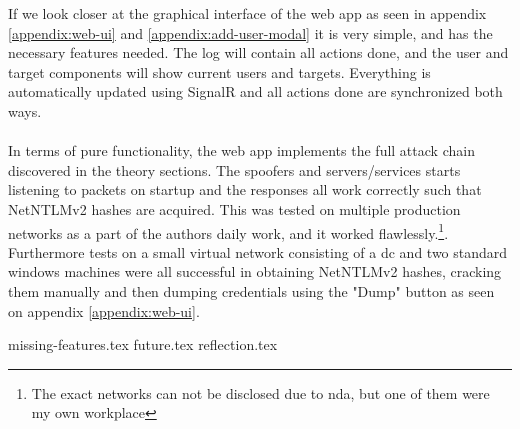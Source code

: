\documentclass{article}
\begin{document}
If we look closer at the graphical interface of the web app as seen in appendix \ref{appendix:web-ui} and \ref{appendix:add-user-modal} it is very simple, and has the necessary features needed. The log will contain all actions done, and the user and target components will show current users and targets. Everything is automatically updated using SignalR and all actions done are synchronized both ways.
\\\\
In terms of pure functionality, the web app implements the full attack chain discovered in the theory sections. The spoofers and servers/services starts listening to packets on startup and the responses all work correctly such that NetNTLMv2 hashes are acquired. This was tested on multiple production networks as a part of the authors daily work, and it worked flawlessly.\footnote{The exact networks can not be disclosed due to \gls{nda}, but one of them were my own workplace}. Furthermore tests on a small virtual network consisting of a \gls{dc} and two standard windows machines were all successful in obtaining NetNTLMv2 hashes, cracking them manually and then dumping credentials using the "Dump" button as seen on appendix \ref{appendix:web-ui}.

{missing-features.tex}
{future.tex}
{reflection.tex}
\end{document}
